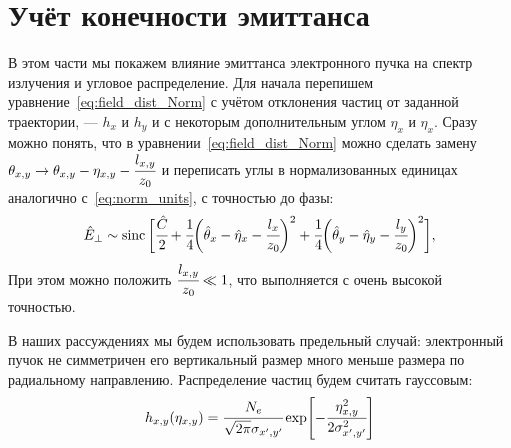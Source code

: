 \chapter{Учёт конечности эмиттанса}
В этом части мы покажем влияние эмиттанса электронного пучка на спектр излучения и угловое распределение. Для начала перепишем уравнение~\ref{eq:field_dist_Norm} с учётом отклонения частиц от заданной траектории, --- $h_x$ и $h_y$ и с некоторым дополнительным углом $\eta_x$ и $\eta_x$. Сразу можно понять, что в уравнении~\ref{eq:field_dist_Norm} можно сделать замену $\theta_{x,y} \rightarrow \theta_{x,y} - \eta_{x, y} - \cfrac{l_{x,y}}{z_0}$ и переписать углы в нормализованных единицах аналогично с~\ref{eq:norm_units}, с точностью до фазы: 
\begin{equation}
\label{eq:field_dist_Norm}
\begin{array}{lcl}
\hat{E}_{\bot} \sim
\operatorname{sinc}\bigg[\cfrac{\hat{C}}{2} + 
\cfrac{1}{4}\bigg(\hat{\theta}_{x} - \hat{\eta}_{x} - \cfrac{l_{x}}{z_0}\bigg)^2 +
\cfrac{1}{4}\bigg(\hat{\theta}_{y} - \hat{\eta}_{y} - \cfrac{l_{y}}{z_0}\bigg)^2\bigg],
\end{array}	
\end{equation}
При этом можно положить  $\cfrac{l_{x,y}}{z_0} \ll 1$, что выполняется с очень высокой точностью. 

В наших рассуждениях мы будем использовать предельный случай: электронный пучок не симметричен его вертикальный размер много меньше размера по радиальному направлению. Распределение частиц будем считать гауссовым: 
\begin{equation}
\label{eq:field_dist_Norm}
h_{x, y}(\eta_{x, y}) = \cfrac{N_e}{\sqrt{2\pi}\sigma_{x', y'}} \exp[-\cfrac{\eta^2_{x, y}}{2\sigma^2_{x', y'}}]
\end{equation}

